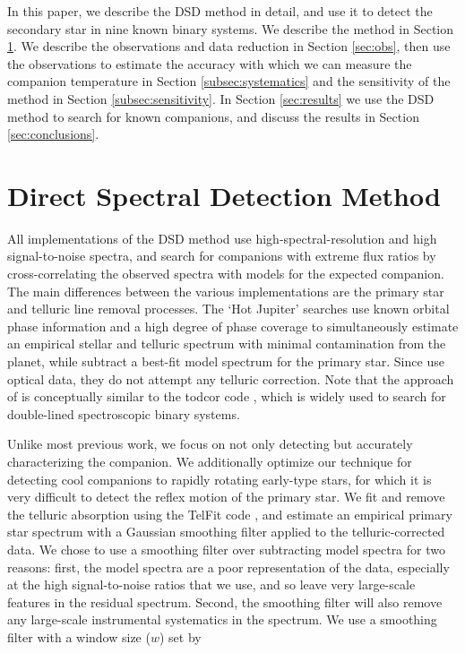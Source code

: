 \documentclass{emulateapj}
\begin{document}
In this paper, we describe the DSD method in detail, and use it to detect the secondary star in nine known binary systems. We describe the method in Section \ref{sec:method}. We describe the observations and data reduction in Section \ref{sec:obs}, then use the observations to estimate the accuracy with which we can measure the companion temperature in Section \ref{subsec:systematics} and the sensitivity of the method in Section \ref{subsec:sensitivity}. In Section \ref{sec:results} we use the DSD method to search for known companions, and discuss the results in Section \ref{sec:conclusions}.


\section{Direct Spectral Detection Method}
\label{sec:method}

All implementations of the DSD method use high-spectral-resolution and high signal-to-noise spectra, and search for companions with extreme flux ratios by cross-correlating the observed spectra with models for the expected companion. The main differences between the various implementations are the primary star and telluric line removal processes. The `Hot Jupiter' searches \citep[e.g.][]{Snellen2010} use known orbital phase information and a high degree of phase coverage to simultaneously estimate an empirical stellar and telluric spectrum with minimal contamination from the planet, while \cite{Kolbl2015} subtract a best-fit model spectrum for the primary star. Since \cite{Kolbl2015} use optical data, they do not attempt any telluric correction. Note that the approach of \cite{Kolbl2015} is conceptually similar to the todcor code \citep{Mazeh1994}, which is widely used to search for double-lined spectroscopic binary systems.

Unlike most previous work, we focus on not only detecting but accurately characterizing the companion. We additionally optimize our technique for detecting cool companions to rapidly rotating early-type stars, for which it is very difficult to detect the reflex motion of the primary star. We fit and remove the telluric absorption using the TelFit code \citep{Gullikson2014}, and estimate an empirical primary star spectrum with a Gaussian smoothing filter applied to the telluric-corrected data. We chose to use a smoothing filter over subtracting model spectra for two reasons: first, the model spectra are a poor representation of the data, especially at the high signal-to-noise ratios that we use, and so leave very large-scale features in the residual spectrum. Second, the smoothing filter will also remove any large-scale instrumental systematics in the spectrum. We use a smoothing filter with a  window size ($w$) set by
\end{document}

